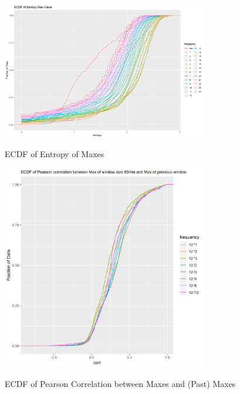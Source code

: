 \documentclass{article}
\begin{document}
\begin{figure}[htbp]
\caption{ECDF of Entropy of Maxes}
\centering
\includegraphics[width = 0.8\textwidth]{ECDFofEntropyMaxValue}
\label{fig:fig1.1.3}
\end{figure}

\begin{figure}[htbp]
\caption{ECDF of Pearson Correlation between Maxes and (Past) Maxes}
\centering
\includegraphics[width = 0.8\textwidth]{ECDFofPearsoncorrelationbetweenMaxofwindowsize60minandMaxofpreviouswindow}
\label{fig:fig1.1.4}
\end{figure}
\end{document}
